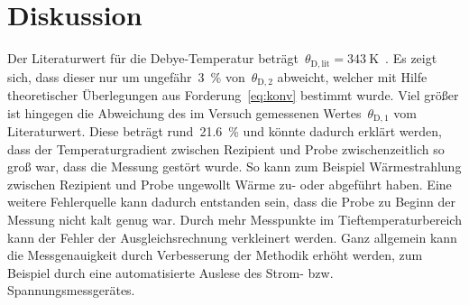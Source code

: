 \section{Diskussion}
\label{sec:diskussion}
%
Der Literaturwert für die Debye-Temperatur
beträgt~$\theta_{\mathrm{D,lit}}=\SI{343}{\kelvin}$~\cite{kittel}.
Es zeigt sich, dass dieser nur um ungefähr~\SI{3}{\percent}
von~$\theta_{\mathrm{D,2}}$ abweicht, welcher mit Hilfe theoretischer
Überlegungen aus Forderung~\eqref{eq:konv} bestimmt wurde.
Viel größer ist hingegen die Abweichung des im Versuch gemessenen
Wertes~$\theta_{\mathrm{D,1}}$ vom Literaturwert. Diese beträgt
rund~\SI{21.6}{\percent} und könnte dadurch erklärt werden, dass der
Temperaturgradient zwischen Rezipient und Probe zwischenzeitlich so groß war,
dass die Messung gestört wurde. So kann zum Beispiel Wärmestrahlung zwischen
Rezipient und Probe ungewollt Wärme zu- oder abgeführt haben. Eine weitere
Fehlerquelle kann dadurch entstanden sein, dass die Probe zu Beginn der Messung
nicht kalt genug war. Durch mehr Messpunkte im Tieftemperaturbereich kann der Fehler der
Ausgleichsrechnung verkleinert werden. Ganz allgemein kann
die Messgenauigkeit durch Verbesserung der Methodik erhöht werden, zum Beispiel
durch eine automatisierte Auslese des Strom- bzw. Spannungsmessgerätes.
